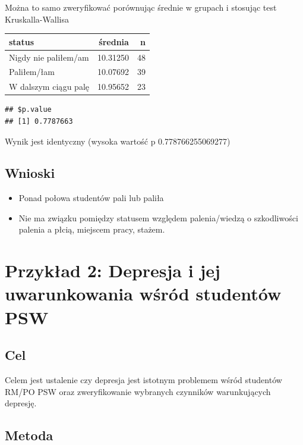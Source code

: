 \documentclass[
  openany]{book}
\begin{document}
Można to samo zweryfikować porównując średnie w grupach
i stosując test Kruskalla-Wallisa

\begin{tabular}{l|r|r}
\hline
status & średnia & n\\
\hline
Nigdy nie paliłem/am & 10.31250 & 48\\
\hline
Paliłem/łam & 10.07692 & 39\\
\hline
W dalszym ciągu palę & 10.95652 & 23\\
\hline
\end{tabular}

\begin{verbatim}
## $p.value
## [1] 0.7787663
\end{verbatim}

Wynik jest identyczny (wysoka wartość p 0.778766255069277)

\hypertarget{wnioski}{%
\subsection{Wnioski}\label{wnioski}}

\begin{itemize}
\item
  Ponad połowa studentów pali lub paliła
\item
  Nie ma związku pomiędzy statusem względem palenia/wiedzą o szkodliwości
  palenia a płcią, miejscem pracy, stażem.
\end{itemize}

\hypertarget{przykux142ad-2-depresja-i-jej-uwarunkowania-wux15bruxf3d-studentuxf3w-psw}{%
\section{Przykład 2: Depresja i jej uwarunkowania wśród studentów PSW}\label{przykux142ad-2-depresja-i-jej-uwarunkowania-wux15bruxf3d-studentuxf3w-psw}}

\hypertarget{cel-1}{%
\subsection{Cel}\label{cel-1}}

Celem jest ustalenie czy depresja jest istotnym problemem wśród
studentów RM/PO PSW oraz
zweryfikowanie wybranych czynników warunkujących depresję.

\hypertarget{metoda-1}{%
\subsection{Metoda}\label{metoda-1}}
\end{document}
